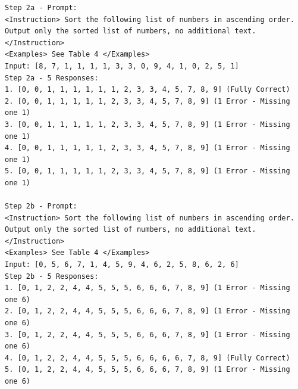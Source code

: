 \documentclass[11pt,UTF8,fontset=fandol]{ctexart}
\begin{document}
\begin{table}[H]\centering
\caption{对 32 元素列表的排序：第 2 步（提示/回复）。}
\label{tab:7}
\end{table}
\begin{lstlisting}
Step 2a - Prompt:
<Instruction> Sort the following list of numbers in ascending order. Output only the sorted list of numbers, no additional text. </Instruction>
<Examples> See Table 4 </Examples>
Input: [8, 7, 1, 1, 1, 1, 3, 3, 0, 9, 4, 1, 0, 2, 5, 1]
Step 2a - 5 Responses:
1. [0, 0, 1, 1, 1, 1, 1, 1, 2, 3, 3, 4, 5, 7, 8, 9] (Fully Correct)
2. [0, 0, 1, 1, 1, 1, 1, 2, 3, 3, 4, 5, 7, 8, 9] (1 Error - Missing one 1)
3. [0, 0, 1, 1, 1, 1, 1, 2, 3, 3, 4, 5, 7, 8, 9] (1 Error - Missing one 1)
4. [0, 0, 1, 1, 1, 1, 1, 2, 3, 3, 4, 5, 7, 8, 9] (1 Error - Missing one 1)
5. [0, 0, 1, 1, 1, 1, 1, 2, 3, 3, 4, 5, 7, 8, 9] (1 Error - Missing one 1)

Step 2b - Prompt:
<Instruction> Sort the following list of numbers in ascending order. Output only the sorted list of numbers, no additional text. </Instruction>
<Examples> See Table 4 </Examples>
Input: [0, 5, 6, 7, 1, 4, 5, 9, 4, 6, 2, 5, 8, 6, 2, 6]
Step 2b - 5 Responses:
1. [0, 1, 2, 2, 4, 4, 5, 5, 5, 6, 6, 6, 7, 8, 9] (1 Error - Missing one 6)
2. [0, 1, 2, 2, 4, 4, 5, 5, 5, 6, 6, 6, 7, 8, 9] (1 Error - Missing one 6)
3. [0, 1, 2, 2, 4, 4, 5, 5, 5, 6, 6, 6, 7, 8, 9] (1 Error - Missing one 6)
4. [0, 1, 2, 2, 4, 4, 5, 5, 5, 6, 6, 6, 6, 7, 8, 9] (Fully Correct)
5. [0, 1, 2, 2, 4, 4, 5, 5, 5, 6, 6, 6, 7, 8, 9] (1 Error - Missing one 6)
\end{lstlisting}
\end{document}
